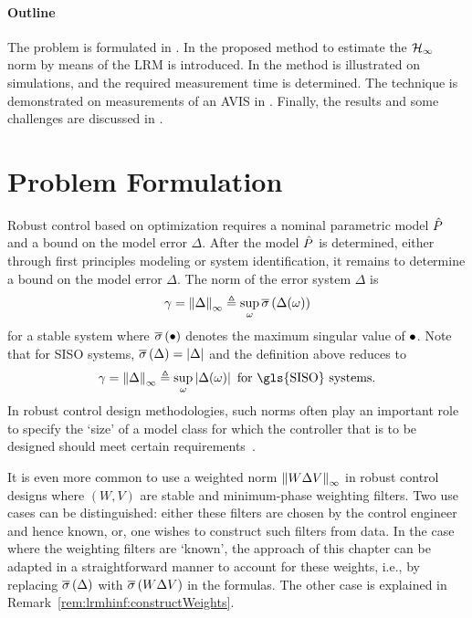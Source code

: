 \paragraph*{Outline}
\label{par:lrmhinf:toc}
The problem is formulated in .
In  the proposed method to estimate the $\mathcal{H}_{\infty}{}$ norm by means of the \gls{LRM} is introduced.
In  the method is illustrated on simulations, and the required measurement time is determined.
The technique is demonstrated on measurements of an \gls{AVIS} in .
Finally, the results and some challenges are discussed in .


\section{Problem Formulation}
\label{sec:lrmhinf:Problem}
Robust control based on \Hinf{} optimization requires a nominal parametric model $\hat{P}$ and a bound on the model error $\Delta$. 
After the model $\hat{P}$ is determined, either through first principles modeling or system identification, it remains to determine a bound on the model error $\Delta$.
The \Hinf{} norm of the error system $\Delta$ is
\begin{equation}
  \gamma 
     = 
       \left\| \Delta \right\|_{\infty} 
    \triangleq 
       \sup_{\omega} 
          \overline{\sigma} \left( \Delta(\omega) \right) 
  \label{eq:lrmhinf:HinfNorm}
\end{equation}
for a stable system where $ \overline{\sigma} \left( \bullet \right) $ denotes the maximum singular value of $\bullet$.
Note that for \gls{SISO} systems, $ \overline{\sigma} \left( \Delta \right)  = \left| \Delta \right|$ and the definition above reduces to
\begin{equation}
  \gamma 
    = 
       \infnorm{\Delta} 
    \isdef 
         \sup_{\omega} 
         \abs{\Delta(\omega)}
  \text{ for \gls{SISO} systems}
  \text{.}
  \label{eq:lrmhinf:HinfNormSISO}
\end{equation}
In robust control design methodologies, such \Hinf{} norms often play an important role to specify the `size' of a model class for which the controller that is to be designed should meet certain requirements~\citep{Skogestad2005}.

\begin{remark}
It is even more common to use a weighted norm $\left\| W \Delta V \right\|_{\infty}$ in robust control designs where $(W,V)$ are stable and minimum-phase weighting filters.
Two use cases can be distinguished: either these filters are chosen by the control engineer and hence known, or, one wishes to construct such filters from data.
In the case where the weighting filters are `known', the approach of this chapter can be adapted in a straightforward manner to account for these weights, i.e., by replacing $ \overline{\sigma} \left( \Delta \right) $ with $ \overline{\sigma} \left( W \Delta V \right) $ in the formulas.
The other case is explained in Remark~\ref{rem:lrmhinf:constructWeights}.
\end{remark}

